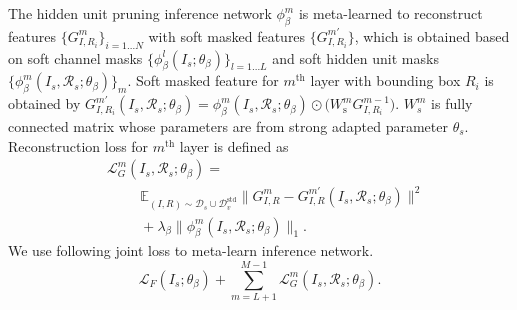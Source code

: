 \documentclass[letterpaper]{article} %
\begin{document}
The hidden unit pruning inference network $\phi^m_\beta$ is meta-learned to reconstruct features $\{G^m_{I,R_i}\}_{i=1...N}$ with soft masked features $\{G^{m\prime}_{I,R_i}\}$, which is obtained based on soft channel masks $\{\phi^l_\beta(I_s;\theta_\beta)\}_{l=1...L}$ and soft hidden unit masks $\{\phi^m_\beta(I_s, \mathcal{R}_s;\theta_\beta)\}_{m}$.
Soft masked feature for $m^\text{th}$ layer with bounding box $R_i$ is obtained by $G^{m\prime}_{I,R_i}(I_s,\mathcal{R}_s;\theta_\beta)=\phi^{m}_\beta(I_s,\mathcal{R}_s;\theta_\beta)\odot\big(W^m_\text{s} G^{m-1}_{I,R_i}\big)$. $W^m_s$ is fully connected matrix whose parameters are from strong adapted parameter $\theta_s$.
Reconstruction loss for $m^\text{th}$ layer is defined as
\begin{equation}\label{fc_prune_loss}
\begin{aligned} 
&\mathcal{L}^m_{G}(I_s, \mathcal{R}_s;\theta_{\beta}) = \\
&\hspace{1cm}\mathbb{E}_{(I,R)\sim \mathcal{D}_s \cup \mathcal{D}_v^\text{std}}  \lVert  G^{m}_{I,R} - G^{m\prime}_{I,R}(I_s,\mathcal{R}_s;\theta_\beta) \rVert^{2} \\
&\hspace{1cm}+\lambda_{\beta} \lVert \phi^m_\beta(I_s,\mathcal{R}_s;\theta_\beta) \rVert_{1}.
\end{aligned}
\end{equation}
We use following joint loss to meta-learn inference network.
\begin{equation}
    \textstyle \mathcal{L}_F(I_s;\theta_\beta) + \sum_{m=L+1}^{M-1}\mathcal{L}_G^m(I_s, \mathcal{R}_s;\theta_\beta).
\end{equation}


\end{document}
